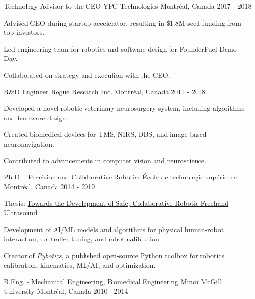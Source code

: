 \documentclass[11pt, letterpaper]{awesome-cv}
\begin{document}
\begin{cventries}
    \cventry
    {Technology Advisor to the CEO}
    {YPC Technologies}
    {Montréal, Canada}
    {2017 - 2018}
    {
        \begin{cvitems}
            \item{Advised CEO during startup accelerator, resulting in \$1.8M seed funding from top investors.}
            \item{Led engineering team for robotics and software design for FounderFuel Demo Day.}
            \item{Collaborated on strategy and execution with the CEO.}
        \end{cvitems}
    }

    \cventry
    {R\&D Engineer}
    {Rogue Research Inc.}
    {Montréal, Canada}
    {2011 - 2018}
    {
        \begin{cvitems}
            \item{Developed a novel robotic veterinary neurosurgery system, including algorithms and hardware design.}
            \item{Created biomedical devices for TMS, NIRS, DBS, and image-based neuronavigation.}
            \item{Contributed to advancements in computer vision and neuroscience.}
        \end{cvitems}
    }
\end{cventries}

\begin{cventries}
    \cventry
    {Ph.D. - Precision and Collaborative Robotics}
    {École de technologie supérieure}
    {Montréal, Canada}
    {2014 - 2019}
    {
        \begin{cvitems}
            \item{Thesis: \href{https://www.nicholasnadeau.com/publication/nadeau-2019-towards/}{Towards the Development of Safe, Collaborative Robotic Freehand Ultrasound}}
            \item{Development of \href{https://www.nicholasnadeau.com/talk/hardware-in-the-loop-training-robot-contact-in-an-unstructured-environment/}{AI/ML models and algorithms} for physical human-robot interaction, \href{https://www.nicholasnadeau.com/publication/nadeau-2018-evolutionary/}{controller tuning}, and \href{https://www.nicholasnadeau.com/publication/nadeau-2019-impedance/}{robot calibration}.}
            \item{Creator of \href{https://github.com/EngNadeau/pybotics}{\textit{Pybotics}}, a \href{https://joss.theoj.org/papers/10.21105/joss.01738}{published} open-source Python toolbox for robotics calibration, kinematics, ML/AI, and optimization.}
        \end{cvitems}
    }

    \cventry
    {B.Eng. - Mechanical Engineering, Biomedical Engineering Minor}
    {McGill University}
    {Montréal, Canada}
    {2010 - 2014}
    {
        \begin{cvitems}
        \end{cvitems}
    }
\end{cventries}
\end{document}
